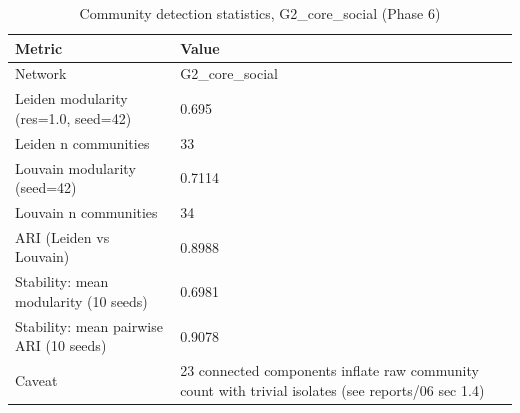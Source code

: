 \begin{table}
\caption{Community detection statistics, G2\_core\_social (Phase 6)}
\label{tab:t05_community_statistics}
\begin{tabular}{ll}
\toprule
Metric & Value \\
\midrule
Network & G2_core_social \\
Leiden modularity (res=1.0, seed=42) & 0.695 \\
Leiden n communities & 33 \\
Louvain modularity (seed=42) & 0.7114 \\
Louvain n communities & 34 \\
ARI (Leiden vs Louvain) & 0.8988 \\
Stability: mean modularity (10 seeds) & 0.6981 \\
Stability: mean pairwise ARI (10 seeds) & 0.9078 \\
Caveat & 23 connected components inflate raw community count with trivial isolates (see reports/06 sec 1.4) \\
\bottomrule
\end{tabular}
\end{table}
